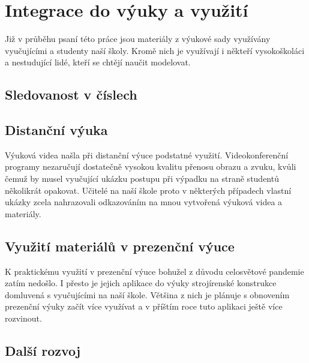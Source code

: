 \chapter{Integrace do výuky a využití}
Již v průběhu psaní této práce jsou materiály z výukové sady využívány vyučujícími a studenty naší školy.
Kromě nich je využívají i někteří vysokoškoláci a nestudující lidé, kteří se chtějí naučit modelovat.

\section{Sledovanost v číslech}
\B{\textcolor{mygreen}{PŠ: Tuto sekci bych rád vztáhnul ke konkrétnímu datu a zmínil konkrétní čísla. Rád bych počkal ještě nějakou chvíli, mezitím by se sledovanost měla přehoupnout přes ty dva tisíce.}\normalsize}

\section{Distanční výuka}
Výuková videa našla při distanční výuce podstatné využití.
Videokonferenční programy nezaručují dostatečně vysokou kvalitu přenosu obrazu a zvuku, kvůli čemuž by musel vyučující ukázku postupu při výpadku na straně studentů několikrát opakovat.
Učitelé na naší škole proto v některých případech vlastní ukázky zcela nahrazovali odkazováním na mnou vytvořená výuková videa a materiály.

\section{Využití materiálů v prezenční výuce}
K praktickému využití v prezenční výuce bohužel z důvodu celosvětové pandemie zatím nedošlo. 
I přesto je jejich aplikace do výuky strojírenské konstrukce domluvená s vyučujícími na naší škole.
Většina z nich je plánuje s obnovením prezenční výuky začít více využívat a v příštím roce tuto aplikaci ještě více rozvinout.

\section{Další rozvoj}

